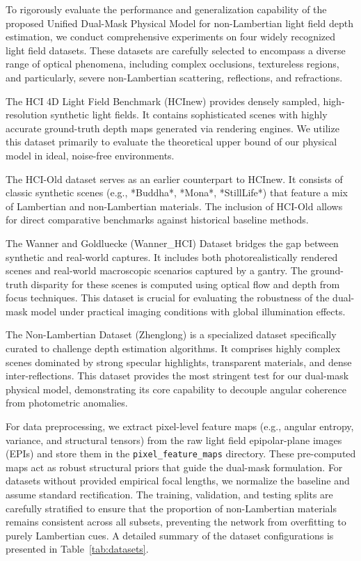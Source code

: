 \documentclass[lettersize,journal]{IEEEtran}
\begin{document}
To rigorously evaluate the performance and generalization capability of the proposed Unified Dual-Mask Physical Model for non-Lambertian light field depth estimation, we conduct comprehensive experiments on four widely recognized light field datasets. These datasets are carefully selected to encompass a diverse range of optical phenomena, including complex occlusions, textureless regions, and particularly, severe non-Lambertian scattering, reflections, and refractions. 

The HCI 4D Light Field Benchmark (HCInew) provides densely sampled, high-resolution synthetic light fields. It contains sophisticated scenes with highly accurate ground-truth depth maps generated via rendering engines. We utilize this dataset primarily to evaluate the theoretical upper bound of our physical model in ideal, noise-free environments. 

The HCI-Old dataset serves as an earlier counterpart to HCInew. It consists of classic synthetic scenes (e.g., *Buddha*, *Mona*, *StillLife*) that feature a mix of Lambertian and non-Lambertian materials. The inclusion of HCI-Old allows for direct comparative benchmarks against historical baseline methods.

The Wanner and Goldluecke (Wanner\_HCI) Dataset bridges the gap between synthetic and real-world captures. It includes both photorealistically rendered scenes and real-world macroscopic scenarios captured by a gantry. The ground-truth disparity for these scenes is computed using optical flow and depth from focus techniques. This dataset is crucial for evaluating the robustness of the dual-mask model under practical imaging conditions with global illumination effects.

The Non-Lambertian Dataset (Zhenglong) is a specialized dataset specifically curated to challenge depth estimation algorithms. It comprises highly complex scenes dominated by strong specular highlights, transparent materials, and dense inter-reflections. This dataset provides the most stringent test for our dual-mask physical model, demonstrating its core capability to decouple angular coherence from photometric anomalies.

For data preprocessing, we extract pixel-level feature maps (e.g., angular entropy, variance, and structural tensors) from the raw light field epipolar-plane images (EPIs) and store them in the \texttt{pixel\_feature\_maps} directory. These pre-computed maps act as robust structural priors that guide the dual-mask formulation. For datasets without provided empirical focal lengths, we normalize the baseline and assume standard rectification. The training, validation, and testing splits are carefully stratified to ensure that the proportion of non-Lambertian materials remains consistent across all subsets, preventing the network from overfitting to purely Lambertian cues. A detailed summary of the dataset configurations is presented in Table~\ref{tab:datasets}.
\end{document}
